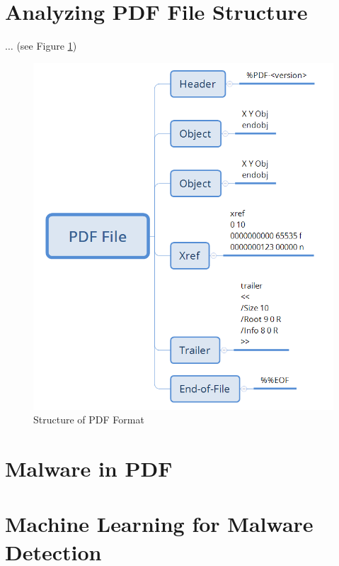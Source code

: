 \section{Analyzing PDF File Structure}
\label{section:pdfStructure}

$\ldots$ (see Figure \ref{pdfSkeleton})

\begin{figure}[ht]
	\centerline{\includegraphics[scale=0.5]{figures/PDFSkeleton.png}}  
	\caption{Structure of PDF Format \cite{winInternals}}
	\label{pdfSkeleton}
\end{figure}


\section{Malware in PDF}
\label{section:malwareInPDF}

\section{Machine Learning for Malware Detection}
\label{section:mlForMalware}

